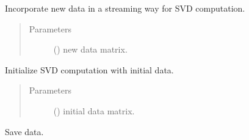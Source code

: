 \documentclass[letterpaper,10pt,english]{sphinxmanual}
\begin{document}
\begin{fulllineitems}
\begin{quote}
\begin{description}
\begin{itemize}
\end{itemize}

\end{description}\end{quote}

\begin{fulllineitems}
\label{\detokenize{index:pyparsvd.parsvd_serial.ParSVD_Serial.incorporate_data}}
\sphinxAtStartPar
Incorporate new data in a streaming way for SVD computation.
\begin{quote}\begin{description}
\item[{Parameters}] \leavevmode
\sphinxAtStartPar
{} () \textendash{} new data matrix.

\end{description}\end{quote}

\end{fulllineitems}


\begin{fulllineitems}
\label{\detokenize{index:pyparsvd.parsvd_serial.ParSVD_Serial.initialize}}
\sphinxAtStartPar
Initialize SVD computation with initial data.
\begin{quote}\begin{description}
\item[{Parameters}] \leavevmode
\sphinxAtStartPar
{} () \textendash{} initial data matrix.

\end{description}\end{quote}

\end{fulllineitems}


\begin{fulllineitems}
\label{\detokenize{index:pyparsvd.parsvd_serial.ParSVD_Serial.save}}
\sphinxAtStartPar
Save data.

\end{fulllineitems}


\end{fulllineitems}
\end{document}
